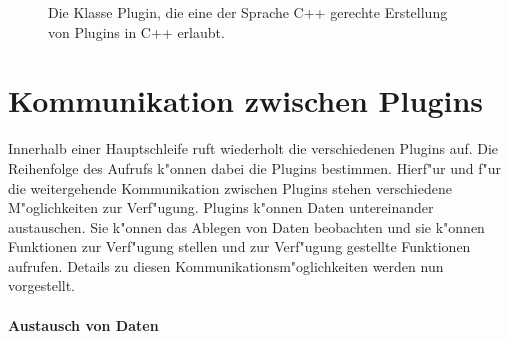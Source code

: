 \begin{figure}[htb]
  \begin{center}
    \begin{small}
    \end{small}
  \end{center}
  \caption[Die Klasse Plugin]
  {Die Klasse Plugin, die eine der Sprache C++ gerechte Erstellung
    von Plugins in C++ erlaubt.}
  \label{fig:p_cpp}
\end{figure}

\section{Kommunikation zwischen Plugins}
\label{sec:p_kommunikation}

Innerhalb einer Hauptschleife ruft \icewing{} wiederholt die
verschiedenen Plugins auf. Die Reihenfolge des Aufrufs k"onnen dabei
die Plugins bestimmen. Hierf"ur und f"ur die weitergehende
Kommunikation zwischen Plugins stehen verschiedene M"oglichkeiten
zur Verf"ugung. Plugins k"onnen Daten untereinander austauschen. Sie
k"onnen das Ablegen von Daten beobachten und sie k"onnen Funktionen
zur Verf"ugung stellen und zur Verf"ugung gestellte Funktionen
aufrufen. Details zu diesen Kommunikationsm"oglichkeiten werden nun
vorgestellt.

\paragraph{Austausch von Daten}\hfill\\

